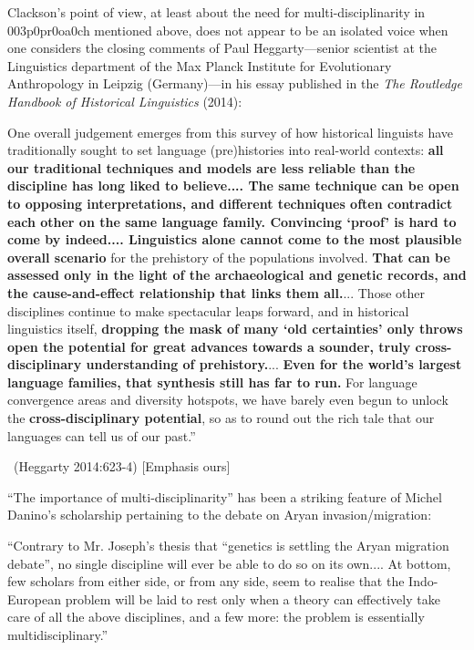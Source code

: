 Clackson’s point of view, at least about the need for multi-disciplinarity in 003p0pr0oa0ch mentioned above, does not appear to be an isolated voice when one considers the closing comments of Paul Heggarty—senior scientist at the Linguistics department of the Max Planck Institute for Evolutionary Anthropology in Leipzig (Germany)—in his essay published in the \textit{The Routledge Handbook of Historical Linguistics }(2014):

\begin{myquote}
One overall judgement emerges from this survey of how historical linguists have traditionally sought to set language (pre)histories into real-world contexts: \textbf{all our traditional techniques and models are less reliable than the discipline has long liked to believe.... The same technique can be open to opposing interpretations, and different techniques often contradict each other on the same language family. Convincing ‘proof’ is hard to come by indeed.... Linguistics alone cannot come to the most plausible overall scenario} for the prehistory of the populations involved. \textbf{That can be assessed only in the light of the archaeological and genetic records, and the cause-and-effect relationship that links them all.}... Those other disciplines continue to make spectacular leaps forward, and in historical linguistics itself, \textbf{dropping the mask of many ‘old certainties’ only throws open the potential for great advances towards a sounder, truly cross-disciplinary understanding of prehistory.}... \textbf{Even for the world’s largest language families, that synthesis still has far to run.} For language convergence areas and diversity hotspots, we have barely even begun to unlock the \textbf{cross-disciplinary potential}, so as to round out the rich tale that our languages can tell us of our past.”

~\hfill (Heggarty 2014:623-4) [Emphasis ours]
\end{myquote}

“The importance of multi-disciplinarity” has been a striking feature of Michel Danino’s scholarship pertaining to the debate on Aryan invasion/migration:

\begin{myquote}
“Contrary to Mr. Joseph’s thesis that “genetics is settling the Aryan migration debate”, no single discipline will ever be able to do so on its own.... At bottom, few scholars from either side, or from any side, seem to realise that the Indo-European problem will be laid to rest only when a theory can effectively take care of all the above disciplines, and a few more: the problem is essentially multidisciplinary.”
\end{myquote}

